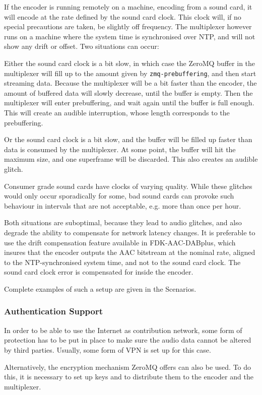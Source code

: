 If the encoder is running remotely on a machine, encoding from a sound card, it
will encode at the rate defined by the sound card clock. This clock will, if no
special precautions are taken, be slightly off frequency. The multiplexer
however runs on a machine where the system time is synchronised over NTP, and
will not show any drift or offset. Two situations can occur:

Either the sound card clock is a bit slow, in which case the ZeroMQ buffer in
the multiplexer will fill up to the amount given by \texttt{zmq-prebuffering},
and then start streaming data. Because the multiplexer will be a bit faster
than the encoder, the amount of buffered data will slowly decrease, until the
buffer is empty. Then the multiplexer will enter prebuffering, and wait again
until the buffer is full enough. This will create an audible interruption,
whose length corresponds to the prebuffering.

Or the sound card clock is a bit slow, and the buffer will be filled up faster
than data is consumed by the multiplexer. At some point, the buffer will hit
the maximum size, and one superframe will be discarded. This also creates an
audible glitch.

Consumer grade sound cards have clocks of varying quality. While these glitches
would only occur sporadically for some, bad sound cards can provoke such
behaviour in intervals that are not acceptable, e.g. more than once per hour.

Both situations are suboptimal, because they lead to audio glitches, and also
degrade the ability to compensate for network latency changes. It is preferable
to use the drift compensation feature available in FDK-AAC-DABplus, which
insures that the encoder outputs the AAC bitstream at the nominal rate, aligned
to the NTP-synchronised system time, and not to the sound card clock. The sound
card clock error is compensated for inside the encoder.

Complete examples of such a setup are given in the Scenarios.

\subsubsection{Authentication Support}
In order to be able to use the Internet as contribution network, some form of
protection has to be put in place to make sure the audio data cannot be altered
by third parties. Usually, some form of VPN is set up for this case.

Alternatively, the encryption mechanism ZeroMQ offers can also be used. To do
this, it is necessary to set up keys and to distribute them to the encoder and
the multiplexer.


